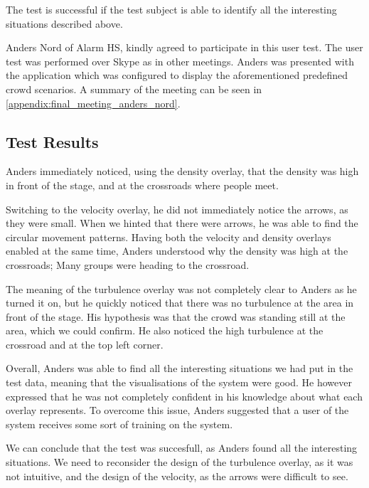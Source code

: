 The test is successful if the test subject is able to identify all the interesting situations described above. 

Anders Nord of Alarm HS, kindly agreed to participate in this user test. The user test was performed over Skype as in other meetings. Anders was presented with the application which was configured to display the aforementioned predefined crowd scenarios. A summary of the meeting can be seen in \cref{appendix:final_meeting_anders_nord}.

\subsection{Test Results}
Anders immediately noticed, using the density overlay, that the density was high in front of the stage, and at the crossroads where people meet. 

Switching to the velocity overlay, he did not immediately notice the arrows, as they were small. When we hinted that there were arrows, he was able to find the circular movement patterns. Having both the velocity and density overlays enabled at the same time, Anders understood why the density was high at the crossroads; Many groups were heading to the crossroad.

The meaning of the turbulence overlay was not completely clear to Anders as he turned it on, but he quickly noticed that there was no turbulence at the area in front of the stage. His hypothesis was that the crowd was standing still at the area, which we could confirm. He also noticed the high turbulence at the crossroad and at the top left corner.

Overall, Anders was able to find all the interesting situations we had put in the test data, meaning that the visualisations of the system were good. He however expressed that he was not completely confident in his knowledge about what each overlay represents. To overcome this issue, Anders suggested that a user of the system receives some sort of training on the system. 

We can conclude that the test was succesfull, as Anders found all the interesting situations. We need to reconsider the design of the turbulence overlay, as it was not intuitive, and the design of the velocity, as the arrows were difficult to see.


